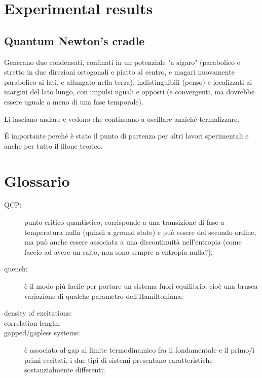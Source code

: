 \documentclass[a4paper,10pt]{article}
\begin{document}
\section{Experimental results}

\subsection{Quantum Newton's cradle} Generano due condensati, confinati in un potenziale "a sigaro" (parabolico e stretto in due direzioni ortogonali e piatto al centro, e magari nuovamente parabolico ai lati, e allungato nella terza), indistinguibili (penso) e localizzati ai margini del lato lungo, con impulsi uguali e opposti (e convergenti, ma dovrebbe essere uguale a meno di una fase temporale).

Li lasciano andare e vedono che continuano a oscillare anziché termalizzare.

\'E importante perché è stato il punto di partenza per altri lavori sperimentali e anche per tutto il filone teorico.

\section{Glossario}

\begin{description}
	\item[QCP:] punto critico quantistico, corrisponde a una transizione di fase a temperatura nulla (quindi a ground state) e può essere del secondo ordine, ma può anche essere associata a una discontinuità nell'entropia (come faccio ad avere un salto, non sono sempre a entropia nulla?);
	\item[quench:] è il modo più facile per portare un sistema fuori equilibrio, cioè una brusca variazione di qualche parametro dell'Hamiltoniana;
	\item[density of excitations:]
	\item[correlation length:]
	\item[gapped/gapless systems:] è associata al gap al limite termodinamico fra il fondamentale e il primo/i primi eccitati, i due tipi di sistemi presentano caratteristiche sostanzialmente differenti;
\end{description}
\end{document}
